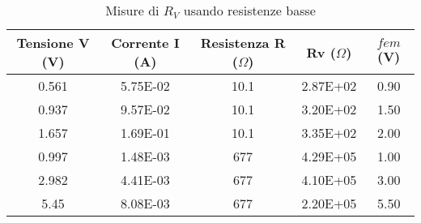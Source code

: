 \begin{table}[H]
\caption{Misure di $R_V$ usando resistenze basse}
\begin{tabular}{|c|c|c|c|c|}
\hline
Tensione V (V) & Corrente I (A) & Resistenza R ($\Omega$) & \textbf{Rv ($\Omega$)} & $fem$ (V) \\
\hline
0.561 & 5.75E-02 & 10.1 & 2.87E+02 & 0.90 \\ 
0.937 & 9.57E-02 & 10.1 & 3.20E+02 & 1.50 \\ 
1.657 & 1.69E-01 & 10.1 & 3.35E+02 & 2.00 \\ 
0.997 & 1.48E-03 & 677 & 4.29E+05 & 1.00 \\ 
2.982 & 4.41E-03 & 677 & 4.10E+05 & 3.00 \\
5.45 & 8.08E-03 & 677 & 2.20E+05 & 5.50 \\ \hline
\end{tabular}
\label{}
\end{table}
